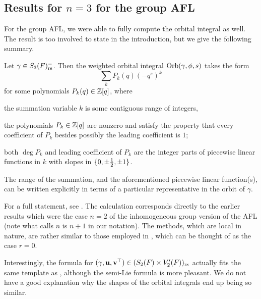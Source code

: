 \subsection{Results for $n=3$ for the group AFL}
\label{sec:results_group_AFL}
For the group AFL, we were able to fully compute the orbital integral as well.
The result is too involved to state in the introduction,
but we give the following summary.
\begin{theorem}
  \label{thm:summary}
  Let $\gamma \in S_3(F)_{\mathrm{rs}}^-$.
  Then the weighted orbital integral $\operatorname{Orb}(\gamma, \phi, s)$ takes the form
  \[ \sum_k P_k(q) (-q^s)^k \]
  for some polynomials $P_k(q) \in \mathbb Z[q]$, where
  \begin{itemize}
    \ii the summation variable $k$ is some contiguous range of integers,

    \ii the polynomials $P_k \in \mathbb Z[q]$ are nonzero and satisfy the property
    that every coefficient of $P_k$ besides possibly the leading coefficient is $1$;

    \ii both $\deg P_k$ and leading coefficient of $P_k$ are the integer parts
    of piecewise linear functions in $k$ with slopes in $\{0, \pm\frac{1}{2}, \pm 1\}$.
  \end{itemize}
  The range of the summation, and the aforementioned piecewise linear function(s),
  can be written explicitly in terms of a particular representative
  in the orbit of $\gamma$.
\end{theorem}
For a full statement, see
.
The calculation corresponds directly to the earlier results
\cite[Lemma 7.1.1 and Proposition 7.3.2]{ref:AFLspherical}
which were the case $n = 2$ of the inhomogeneous group version of the AFL
(note what \cite{ref:AFLspherical} calls $n$ is $n+1$ in our notation).
The methods, which are local in nature,
are rather similar to those employed in \cite{ref:AFL},
which can be thought of as the case $r = 0$.

\begin{remark}
  Interestingly, the formula 
  for ${(\gamma, \mathbf u, \mathbf v^\top)} \in (S_2(F) \times V'_2(F))_{\mathrm{rs}}$
  actually fits the same template as ,
  although the semi-Lie formula is more pleasant.
  We do not have a good explanation why the shapes of the orbital integrals
  end up being so similar.
\end{remark}

